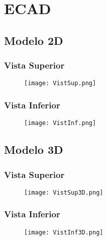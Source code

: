 \section{ECAD}
\subsection{Modelo 2D}
\subsubsection{Vista Superior}
\begin{figure}[H]
	\centering
	\texttt{[image: VistSup.png]}
	\label{fig:VistSup}
\end{figure}

\subsubsection{Vista Inferior}
\begin{figure}[H]
	\centering
	\texttt{[image: VistInf.png]}
	\label{fig:VistInf}
\end{figure}

\subsection{Modelo 3D}
\subsubsection{Vista Superior}
\begin{figure}[H]
	\centering
	\texttt{[image: VistSup3D.png]}
	\label{fig:VistSup3D}
\end{figure}

\subsubsection{Vista Inferior}
\begin{figure}[H]
	\centering
	\texttt{[image: VistInf3D.png]}
	\label{fig:VistInf3D}
\end{figure}

